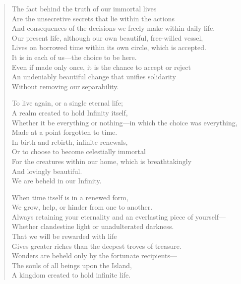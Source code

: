 \documentclass[11pt, letterpaper]{article}
\begin{document}
\begin{verse}
The fact behind the truth of our immortal lives\\
Are the unsecretive secrets that lie within the actions\\
And consequences of the decisions we freely make within daily life.\\
Our present life, although our own beautiful, free-willed vessel,\\
Lives on borrowed time within its own circle, which is accepted.\\
It is in each of us---the choice to be here.\\
Even if made only once, it is the chance to accept or reject\\
An undeniably beautiful change that unifies solidarity\\
Without removing our separability.

To live again, or a single eternal life;\\
A realm created to hold Infinity itself,\\
Whether it be everything or nothing---in which the choice was everything,\\
Made at a point forgotten to time.\\
In birth and rebirth, infinite renewals,\\
Or to choose to become celestially immortal\\
For the creatures within our home, which is breathtakingly\\
And lovingly beautiful.\\
We are beheld in our Infinity.

When time itself is in a renewed form,\\
We grow, help, or hinder from one to another.\\
Always retaining your eternality and an everlasting piece of yourself---\\
Whether clandestine light or unadulterated darkness.\\
That we will be rewarded with life\\
Gives greater riches than the deepest troves of treasure.\\
Wonders are beheld only by the fortunate recipients---\\
The souls of all beings upon the Island,\\
A kingdom created to hold infinite life.


\end{verse}
\end{document}

